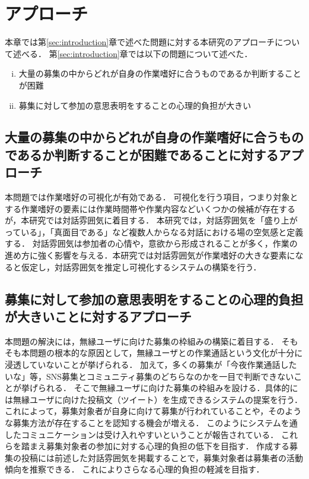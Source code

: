 \chapter{アプローチ\label{sec:approach}}
\thispagestyle{plain}

本章では第\ref{sec:introduction}章で述べた問題に対する本研究のアプローチについて述べる．
第\ref{sec:introduction}章では以下の問題について述べた．

\begin{enumerate}[i.]
    \item 大量の募集の中からどれが自身の作業嗜好に合うものであるか判断することが困難
    \item 募集に対して参加の意思表明をすることの心理的負担が大きい
\end{enumerate}

\section{大量の募集の中からどれが自身の作業嗜好に合うものであるか判断することが困難であることに対するアプローチ}

本問題では作業嗜好の可視化が有効である．
可視化を行う項目，つまり対象とする作業嗜好の要素には作業時間帯や作業内容などいくつかの候補が存在するが，本研究では対話雰囲気に着目する．
本研究では，対話雰囲気を「盛り上がっている」，「真面目である」など複数人からなる対話における場の空気感と定義する．
対話雰囲気は参加者の心情や，意欲から形成されることが多く，作業の進め方に強く影響を与える．本研究では対話雰囲気が作業嗜好の大きな要素になると仮定し，対話雰囲気を推定し可視化するシステムの構築を行う．

\section{募集に対して参加の意思表明をすることの心理的負担が大きいことに対するアプローチ}

本問題の解決には，無縁ユーザに向けた募集の枠組みの構築に着目する．
そもそも本問題の根本的な原因として，無縁ユーザとの作業通話という文化が十分に浸透していないことが挙げられる．
加えて，多くの募集が「今夜作業通話したいな」等，SNS募集とコミュニティ募集のどちらなのかを一目で判断できないことが挙げられる．
そこで無縁ユーザに向けた募集の枠組みを設ける．具体的には無縁ユーザに向けた投稿文（ツイート）を生成できるシステムの提案を行う．
これによって，募集対象者が自身に向けて募集が行われていることや，そのような募集方法が存在することを認知する機会が増える．
このようにシステムを通したコミュニケーションは受け入れやすいということが報告されている\cite{Harada}\cite{Kimura}\cite{Nishimura}\cite{Tsuzuki}．
これらを踏まえ募集対象者の参加に対する心理的負担の低下を目指す．
作成する募集の投稿には前述した対話雰囲気を掲載することで，募集対象者は募集者の活動傾向を推察できる．
これによりさらなる心理的負担の軽減を目指す．
